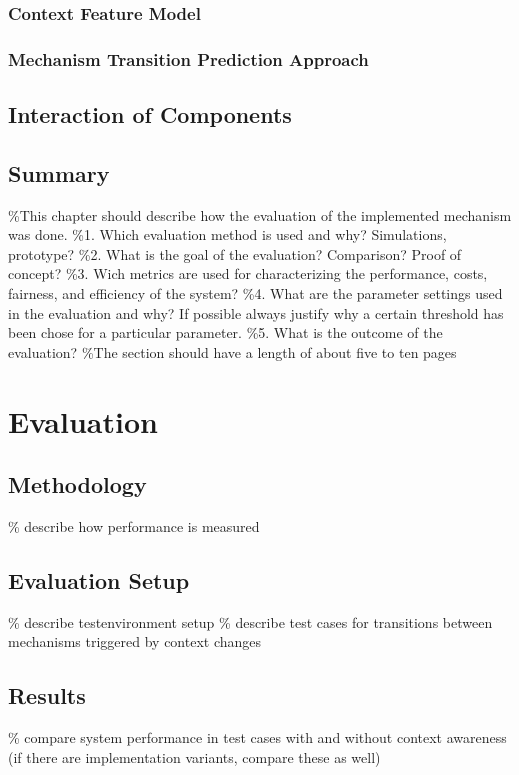 \subsection{Context Feature Model}
\subsection{Mechanism Transition Prediction Approach}

\section{Interaction of Components}
\section{Summary}


\%This chapter should describe how the evaluation of the implemented mechanism was done.
\%1. Which evaluation method is used and why? Simulations, prototype?
\%2. What is the goal of the evaluation? Comparison? Proof of concept?
\%3. Wich metrics are used for characterizing the performance, costs, fairness, and efficiency of the system?
\%4. What are the parameter settings used in the evaluation and why? If possible always justify why a certain threshold has been chose for a particular parameter.
\%5. What is the outcome of the evaluation?
\%The section should have a length of about five to ten pages
\chapter{Evaluation}
\section{Methodology}
\% describe how performance is measured

\section{Evaluation Setup}
\% describe testenvironment setup
\% describe test cases for transitions between mechanisms triggered by context changes

\section{Results}
\% compare system performance in test cases with and without context awareness (if there are implementation variants, compare these as well)

